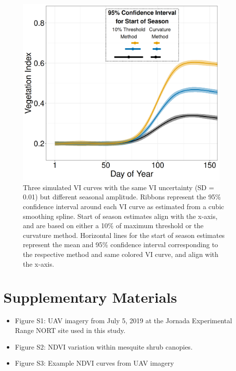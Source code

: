 \documentclass{article}
\begin{document}
\begin{figure}[h]
    \centering
    \includegraphics[width=0.95\textwidth]{figures/fig8_sos_uncertainty.png}
    \caption{Three simulated VI curves with the same VI uncertainty (SD = 0.01) but different seasonal amplitude. Ribbons represent the 95\% confidence interval around each VI curve as estimated from a cubic smoothing spline. Start of season estimates align with the x-axis, and are based on either a 10\% of maximum threshold or the curvature method.  Horizontal lines for the start of season estimates represent the mean and 95\% confidence interval corresponding to the respective method and same colored VI curve, and align with the x-axis.}
    \label{fig5}
\end{figure}

\section*{Supplementary Materials}
\begin{itemize}
    \item Figure S1: UAV imagery from July 5, 2019 at the Jornada Experimental Range NORT site used in this study.

    \item Figure S2: NDVI variation within mesquite shrub canopies.

    \item Figure S3: Example NDVI curves from UAV imagery

\end{itemize}
\end{document}
